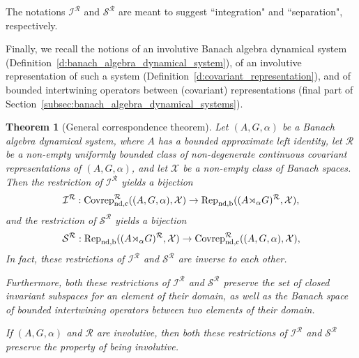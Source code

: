 \documentclass{amsart}
\theoremstyle{plain}
\newtheorem{theorem}{Theorem}[section]
\theoremstyle{definition}
\numberwithin{equation}{section}
\begin{document}
The notations ${{\mathcal I}^{\mathcal R}}$ and ${{\mathcal S}^{\mathcal R}}$ are meant to suggest ``integration" and ``separation", respectively.

Finally, we recall the notions of an involutive Banach algebra dynamical system (Definition~\ref{d:banach_algebra_dynamical_system}), of an involutive representation of such a system (Definition~\ref{d:covariant_representation}), and of bounded intertwining operators between (covariant) representations (final part of Section~\ref{subsec:banach_algebra_dynamical_systems}).

\begin{theorem}[General correspondence theorem]\label{t:bijection}
Let ${(A,G,\alpha)}$ be a Banach algebra dynamical system, where $A$ has a bounded approximate left identity, let ${\mathcal R}$ be a non-empty uniformly bounded class of non-degenerate continuous covariant representations of ${(A,G,\alpha)}$, and let ${\mathcal X}$ be a non-empty class of Banach spaces.
Then the restriction of ${{\mathcal I}^{\mathcal R}}$ yields a bijection
\[
{{\mathcal I}^{\mathcal R}}:{\ensuremath{{\textup{Covrep}}_{\textup{nd,c}}^{\mathcal R}}}({(A,G,\alpha)},{\mathcal X})\to{\ensuremath{\textup{Rep}_{\textup{nd,b}}}}({(A {\rtimes}_\alpha G)^\mathcal{R}},{\mathcal X}),
\]
and the restriction of ${{\mathcal S}^{\mathcal R}}$ yields a bijection
\[
{{\mathcal S}^{\mathcal R}}:{\ensuremath{\textup{Rep}_{\textup{nd,b}}}}({(A {\rtimes}_\alpha G)^\mathcal{R}},{\mathcal X})\to{\ensuremath{{\textup{Covrep}}_{\textup{nd,c}}^{\mathcal R}}}({(A,G,\alpha)},{\mathcal X}),
\]
In fact, these restrictions of ${{\mathcal I}^{\mathcal R}}$ and ${{\mathcal S}^{\mathcal R}}$ are inverse to each other.

Furthermore, both these restrictions of ${{\mathcal I}^{\mathcal R}}$ and ${{\mathcal S}^{\mathcal R}}$ preserve the set of closed invariant subspaces for an element of their domain, as well as the Banach space of bounded intertwining operators between two elements of their domain.

If ${(A,G,\alpha)}$ and ${\mathcal R}$ are involutive, then both these restrictions of ${{\mathcal I}^{\mathcal R}}$ and ${{\mathcal S}^{\mathcal R}}$ preserve the property of being involutive.
\end{theorem}
\end{document}
